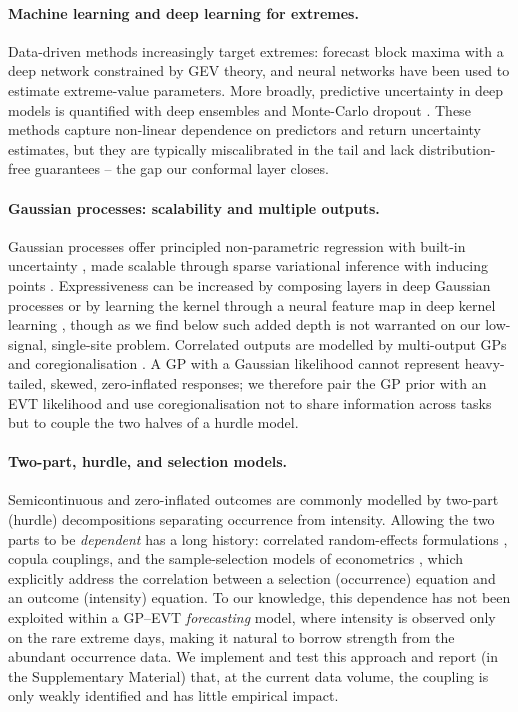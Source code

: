 \documentclass[11pt,a4paper]{article}
\begin{document}
\paragraph{Machine learning and deep learning for extremes.}
Data-driven methods increasingly target extremes: \citet{galib2022deepextrema}
forecast block maxima with a deep network constrained by GEV theory, and neural
networks have been used to estimate extreme-value parameters. More broadly,
predictive uncertainty in deep models is quantified with deep ensembles
\citep{lakshminarayanan2017} and Monte-Carlo dropout \citep{gal2016}. These
methods capture non-linear dependence on predictors and return uncertainty
estimates, but they are typically miscalibrated in the tail and lack
distribution-free guarantees -- the gap our conformal layer closes.

\paragraph{Gaussian processes: scalability and multiple outputs.}
Gaussian processes offer principled non-parametric regression with built-in
uncertainty \citep{rasmussen2006gpml}, made scalable through sparse variational
inference with inducing points \citep{titsias2009,hensman2013,salimbeni2017doubly}.
Expressiveness can be increased by composing layers in deep Gaussian processes
\citep{damianou2013deep} or by learning the kernel through a neural feature
map in deep kernel learning \citep{wilson2016deepkernel}, though as we find below such added depth is not warranted on our low-signal, single-site
problem. Correlated outputs are
modelled by multi-output GPs and coregionalisation
\citep{bonilla2008multitask,alvarez2012kernels}. A GP with a Gaussian likelihood
cannot represent heavy-tailed, skewed, zero-inflated responses; we therefore
pair the GP prior with an EVT likelihood and use coregionalisation not to share
information across tasks but to couple the two halves of a hurdle model.

\paragraph{Two-part, hurdle, and selection models.}
Semicontinuous and zero-inflated outcomes are commonly modelled by two-part
(hurdle) decompositions separating occurrence from intensity. Allowing the two
parts to be \emph{dependent} has a long history: correlated random-effects
formulations \citep{olsen2001twopart}, copula couplings, and the sample-selection
models of econometrics \citep{heckman1979selection}, which explicitly address the
correlation between a selection (occurrence) equation and an outcome (intensity)
equation. To our knowledge, this dependence has not been exploited within a GP--EVT \emph{forecasting} model, where intensity is observed only on the rare extreme days, making it natural to borrow strength from the abundant occurrence data. We implement and test this approach and report (in the Supplementary Material) that, at the current data volume, the coupling is only weakly identified and has little empirical impact.
\end{document}
